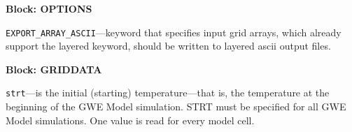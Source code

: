 
\item \textbf{Block: OPTIONS}

\begin{description}
\item \texttt{EXPORT\_ARRAY\_ASCII}---keyword that specifies input grid arrays, which already support the layered keyword, should be written to layered ascii output files.

\end{description}
\item \textbf{Block: GRIDDATA}

\begin{description}
\item \texttt{strt}---is the initial (starting) temperature---that is, the temperature at the beginning of the GWE Model simulation.  STRT must be specified for all GWE Model simulations. One value is read for every model cell.

\end{description}

